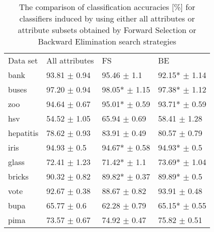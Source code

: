 \documentclass{elsart}
\begin{document}
\begin{table}
\label{selection} \centering \caption{The comparison of classification
accuracies [\%]  for classifiers induced by using either all attributes or
attribute subsets obtained by Forward Selection or Backward Elimination
search strategies}
\begin{tabular}{llll}
\hline\noalign{\smallskip} Data set &  All attributes & FS & BE \\
\noalign{\smallskip} \hline \noalign{\smallskip} bank & 93.81
\scriptsize{$\pm$  0.94} &  95.46 \scriptsize{$\pm$ 1.1} & 92.15*
\scriptsize{$\pm$ 1.14}  \\ buses & 97.20 \scriptsize{$\pm$ 0.94} & 98.05*
\scriptsize{$\pm$ 1.15} & 97.38* \scriptsize{$\pm$ 1.12}
\\
zoo & 94.64 \scriptsize{$\pm$ 0.67}&  95.01* \scriptsize{$\pm$
0.59} & 93.71* \scriptsize{$\pm$ 0.59}
\\ hsv & 54.52 \scriptsize{$\pm$ 1.05} & 65.94 \scriptsize{$\pm$
0.69} &  58.41 \scriptsize{$\pm$ 1.28}\\ hepatitis & 78.62
\scriptsize{$\pm$ 0.93} &  83.91 \scriptsize{$\pm$ 0.49} & 80.57
\scriptsize{$\pm$ 0.79}\\ iris & 94.93 \scriptsize{$\pm$ 0.5} &
94.67* \scriptsize{$\pm$ 0.58} & 94.93* \scriptsize{$\pm$ 0.5}
\\ glass & 72.41 \scriptsize{$\pm$ 1.23} & 71.42* \scriptsize{$\pm$
1.1} & 73.69* \scriptsize{$\pm$ 1.04} \\ bricks & 90.32
\scriptsize{$\pm$ 0.82} & 89.82* \scriptsize{$\pm$ 0.37} & 89.89*
\scriptsize{$\pm$ 0.5}
\\ vote & 92.67 \scriptsize{$\pm$ 0.38}  & 88.67 \scriptsize{$\pm$
0.82} & 93.91 \scriptsize{$\pm$ 0.48}
\\ bupa & 65.77 \scriptsize{$\pm$ 0.6} & 62.28 \scriptsize{$\pm$
0.79} & 65.15* \scriptsize{$\pm$ 0.55}
\\  pima & 73.57 \scriptsize{$\pm$ 0.67}  & 74.92
\scriptsize{$\pm$ 0.47} & 75.82 \scriptsize{$\pm$ 0.51} \\
 \hline
\end{tabular}
\end{table}
\end{document}
